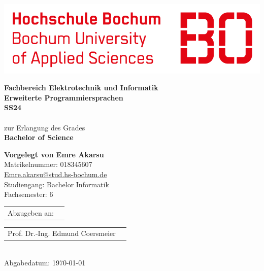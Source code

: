 \setlength\parindent{0cm}


\begin{titlepage}
	\includegraphics[scale = 0.6]{HSBochum-logo.png}

	\vspace{2cm}
	{
		\begin{center}
			\LARGE\textbf{Fachbereich Elektrotechnik und Informatik}\\
			\vspace{0.3cm}
			\textbf{Erweiterte Programmiersprachen}\\
			\vspace{0.3cm}
			\textbf{SS24}\\
			\vspace{1cm}
			\LARGE\textit{\grqq }\\
			\vspace{1cm}
			\large{zur Erlangung des Grades\\}
			\textbf{Bachelor of Science}
		\end{center}
	}

	\vspace{3cm}
	{
		\large\textbf{Vorgelegt von Emre Akarsu\\}
		\normalsize{Matrikelnummer: 018345607}\\
		\href{mailto: emre.akarsu@stud.hs-bochum.de}{Emre.akarsu@stud.hs-bochum.de}
		\\
		Studiengang: Bachelor Informatik\\
		Fachsemester: 6
	}

	\vspace{3cm}
	{
		\begin{tabular}{@{}ll}
			Abzugeben an:
		\end{tabular}
		\begin{tabular}{@{}ll}
			Prof. Dr.-Ing. Edmund Coersmeier
		\end{tabular}
	}
	\\Abgabedatum: \today
\end{titlepage}

